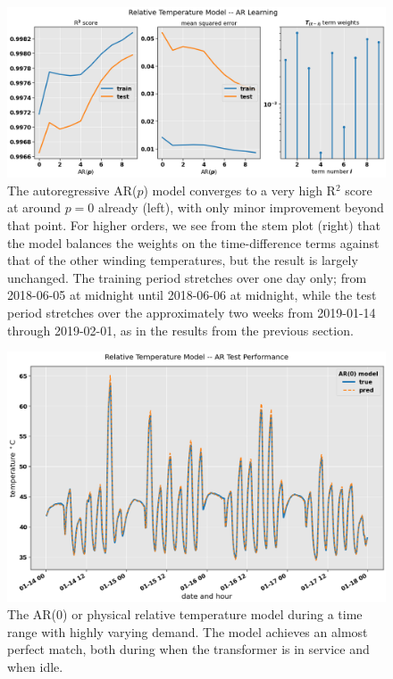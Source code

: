 \documentclass[]{article}
\begin{document}
\begin{figure}[!h]
	\centering
	\includegraphics[width=1\linewidth]{./figs/ar-model-learning-relative.png}
	\caption{The autoregressive AR($p$) model converges to a very high R$^2$ score at around $p = 0$ already (left), with only minor improvement beyond that point. For higher orders, we see from the stem plot (right) that the model balances the weights on the time-difference terms against that of the other winding temperatures, but the result is largely unchanged. The training period stretches over one day only; from 2018-06-05 at midnight until 2018-06-06 at midnight, while the test period stretches over the approximately two weeks from 2019-01-14 through 2019-02-01, as in the results from the previous section.}
	\label{fig:ar-model-learning-relative}
\end{figure}

\begin{figure}[!h]
	\centering
	\includegraphics[width=1\linewidth]{./figs/ar-model-performance-relative.png}
	\caption{The AR($0$) or physical relative temperature model during a time range with highly varying demand. The model achieves an almost perfect match, both during when the transformer is in service and when idle.}
	\label{fig:ar-model-performance-relative}
\end{figure}
\end{document}
